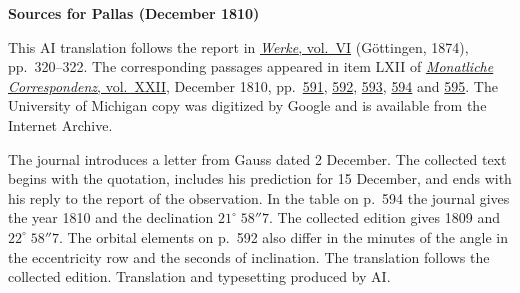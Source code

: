 \clearpage\thispagestyle{empty}
\begin{center}\textbf{Sources for Pallas (December 1810)}\end{center}
\noindent This AI translation follows the report in \href{https://gdz.sub.uni-goettingen.de/id/PPN236007467}{\textit{Werke}, vol.~VI} (Göttingen, 1874), pp.~320--322. The corresponding passages appeared in item LXII of \href{https://archive.org/download/bub_gb_YCI4AAAAMAAJ/page/n4.jpg}{\textit{Monatliche Correspondenz}, vol.~XXII}, December 1810, pp.~\href{https://archive.org/download/bub_gb_YCI4AAAAMAAJ/page/n594.jpg}{591}, \href{https://archive.org/download/bub_gb_YCI4AAAAMAAJ/page/n595.jpg}{592}, \href{https://archive.org/download/bub_gb_YCI4AAAAMAAJ/page/n596.jpg}{593}, \href{https://archive.org/download/bub_gb_YCI4AAAAMAAJ/page/n597.jpg}{594} and \href{https://archive.org/download/bub_gb_YCI4AAAAMAAJ/page/n598.jpg}{595}. The University of Michigan copy was digitized by Google and is available from the Internet Archive.
\par\smallskip\noindent The journal introduces a letter from Gauss dated 2 December. The collected text begins with the quotation, includes his prediction for 15 December, and ends with his reply to the report of the observation. In the table on p.~594 the journal gives the year 1810 and the declination $21^\circ\;58''7$. The collected edition gives 1809 and $22^\circ\;58''7$. The orbital elements on p.~592 also differ in the minutes of the angle in the eccentricity row and the seconds of inclination. The translation follows the collected edition. Translation and typesetting produced by AI.
\clearpage
